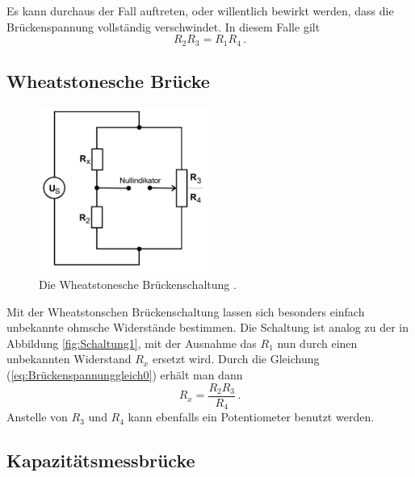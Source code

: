 Es kann durchaus der Fall auftreten, oder willentlich bewirkt werden, dass die Brückenspannung vollständig verschwindet.
In diesem Falle gilt
\begin{equation} \label{eq:Brückenspannunggleich0}
    R_2 R_3 = R_1 R_4 \, .
\end{equation}

\subsection{Wheatstonesche Brücke}

\begin{figure}
    \centering
    \includegraphics[width=0.5\textwidth]{pictures/Schaltung2.png}
    \caption{Die Wheatstonesche Brückenschaltung \cite[4]{v302}.}
    \label{fig:Schaltung2}
\end{figure}

Mit der Wheatstonschen Brückenschaltung lassen sich besonders einfach unbekannte ohmsche Widerstände bestimmen.
Die Schaltung ist analog zu der in Abbildung \ref{fig:Schaltung1}, mit der Ausnahme das $R_1$ nun durch einen unbekannten Widerstand
$R_x$ ersetzt wird.
Durch die Gleichung (\ref{eq:Brückenspannunggleich0}) erhält man dann 
\begin{equation} \label{eq:Rx}
    R_x = \frac {R_2 R_3}{R_4} \, .
\end{equation}
Anstelle von $R_3$ und $R_4$ kann ebenfalls ein Potentiometer benutzt werden.

\subsection{Kapazitätsmessbrücke}

